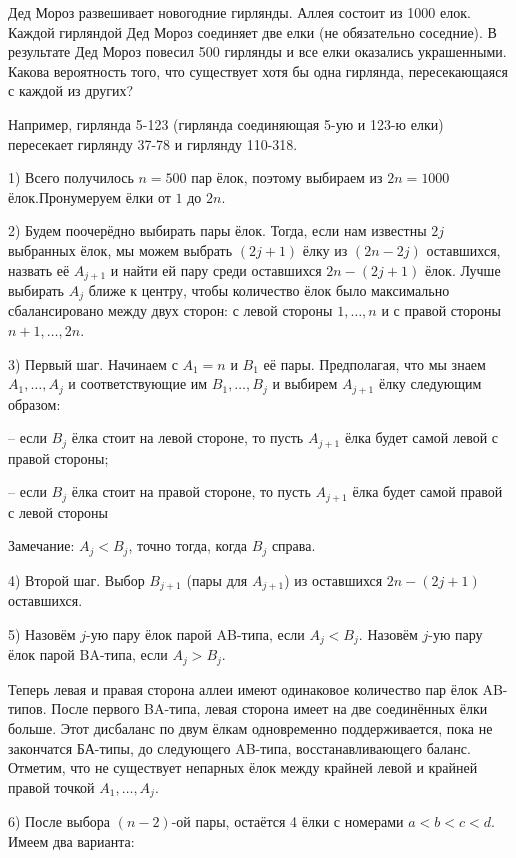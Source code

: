 \documentclass[nobib]{tufte-handout}
\theoremstyle{definition}
\newcounter{problem}
\newenvironment{problem}%
{%
\refstepcounter{problem}%
     \hypertarget{problem:{\theproblem}}{}
     \Writetofile{solution_file}{\protect\hypertarget{soln:\theproblem}{}}
     \begin{myenum}[label=\bfseries\protect\hyperlink{soln:\theproblem}{\theproblem},ref=\theproblem]
     \item%
    }%
    {%
    \end{myenum}}
\begin{document}
\begin{problem}
Дед Мороз развешивает новогодние гирлянды. Аллея состоит из 1000 елок. Каждой гирляндой Дед Мороз соединяет две елки (не обязательно соседние). В результате Дед Мороз повесил 500 гирлянды и все елки оказались украшенными. Какова вероятность того, что существует хотя бы одна гирлянда, пересекающаяся с каждой из других?

Например, гирлянда 5-123 (гирлянда соединяющая 5-ую и 123-ю елки) пересекает гирлянду 37-78 и гирлянду 110-318.

\begin{sol}
1) Всего получилось $n=500$ пар ёлок, поэтому выбираем из $2n=1000$ ёлок.Пронумеруем ёлки от $1$ до $2n$.

2) Будем поочерёдно выбирать пары ёлок. Тогда, если нам известны $2j$ выбранных ёлок, мы можем выбрать $(2j+1)$ ёлку из $(2n-2j)$ оставшихся, назвать её $A_{j+1}$ и найти ей пару среди оставшихся $2n-(2j+1)$ ёлок. Лучше выбирать $A_j$ ближе к центру, чтобы количество ёлок было максимально сбалансировано между двух сторон: с левой стороны ${1,\ldots ,n}$ и с правой стороны ${n+1,\ldots ,2n}$.

3) Первый шаг. Начинаем с $A_1=n$ и $B_1$ её пары. Предполагая, что мы знаем $A_1,\ldots ,A_j$  и соответствующие им $B_1,\ldots , B_j$ и выбирем $A_{j+1}$ ёлку следующим образом:

– если $B_j$ ёлка стоит на левой стороне, то пусть $A_{j+1}$ ёлка будет самой левой с правой стороны;

– если $B_j$ ёлка стоит на правой стороне, то пусть $A_{j+1}$ ёлка будет самой правой с левой стороны

Замечание: $A_j<B_j$, точно тогда, когда $B_j$ справа.

4) Второй шаг. Выбор $B_{j+1}$ (пары для $A_{j+1}$) из оставшихся $2n-(2j+1)$ оставшихся.

5) Назовём $j$-ую пару ёлок парой AB-типа, если $A_j<B_j$.
Назовём $j$-ую пару ёлок парой BA-типа, если $A_j>B_j$.

Теперь левая и правая сторона аллеи имеют одинаковое количество пар ёлок AB-типов. После первого BA-типа, левая сторона имеет на две соединённых ёлки больше. Этот дисбаланс по двум ёлкам одновременно поддерживается, пока не закончатся БА-типы, до следующего AB-типа, восстанавливающего баланс. Отметим, что не существует непарных ёлок между крайней левой и крайней правой точкой $A_1,\ldots ,A_j$.

6) После выбора $(n-2)$-ой пары, остаётся 4 ёлки с номерами $a < b < c < d$. Имеем два варианта:


\end{sol}
\end{problem}
\end{document}
